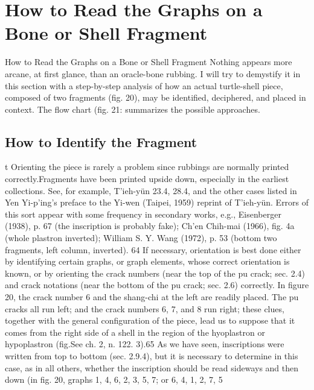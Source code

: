 \section[How to Read the Graphs on a Bone or Shel]{How to Read the Graphs on a Bone or Shell Fragment}
\label{sec:chapters-ch03:3.6}

How to Read the Graphs on a
Bone or Shell Fragment
Nothing appears more arcane, at first glance, than an oracle-bone rubbing. I
will try to demystify it in this section with a step-by-step analysis of how an actual turtle-shell piece, composed of two fragments (fig. 20), may be identified, deciphered, and placed
in context. The flow chart (fig. 21: summarizes the possible approaches.

\subsection[How to Identify the Fragment]{How to Identify the Fragment}
\label{sec:chapters-ch03:3.6.1}

t
Orienting the piece is rarely a problem since rubbings are normally printed
correctly.Fragments have been printed upside down, especially in the earliest collections. See, for example, T'ieh-yün 23.4, 28.4, and the other cases listed in Yen Yi-p'ing's preface to the Yi-wen (Taipei, 1959) reprint of T'ieh-yün. Errors of this sort appear with some frequency in secondary works, e.g., Eisenberger (1938), p. 67 (the inscription is probably fake); Ch'en Chih-mai (1966), fig. 4a (whole plastron inverted); William S. Y. Wang (1972), p. 53 (bottom two fragments, left column, inverted). 64 If necessary, orientation is best done either by identifying certain graphs, or
graph elements, whose correct orientation is known, or by orienting the crack numbers
(near the top of the pu crack; sec. 2.4) and crack notations (near the bottom of the pu
crack; sec. 2.6) correctly. In figure 20, the crack number 6 and the shang-chi at the
left are readily placed. The pu cracks all run left; and the crack numbers 6, 7, and 8 run
right; these clues, together with the general configuration of the piece, lead us to suppose
that it comes from the right side of a shell in the region of the hyoplastron or hypoplastron
(fig.See ch. 2, n. 122. 3).65
As we have seen, inscriptions were written from top to bottom (sec. 2.9.4), but it is
necessary to determine in this case, as in all others, whether the inscription should be read
sideways and then down (in fig. 20, graphs 1, 4, 6, 2, 3, 5, 7; or 6, 4, 1, 2, 7, 5

